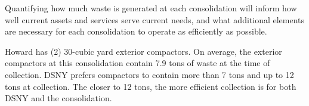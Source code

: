 
    Quantifying how much waste is generated at each consolidation will inform how well current assets and services serve current needs, and what additional elements are necessary for each consolidation to operate as efficiently as possible.
    
    Howard has (2) 30-cubic yard exterior compactors. On average, the exterior compactors at this consolidation contain 7.9 tons of waste at the time of collection. DSNY prefers compactors to contain more than 7 tons and up to 12 tons at collection. The closer to 12 tons, the more efficient collection is for both DSNY and the consolidation.